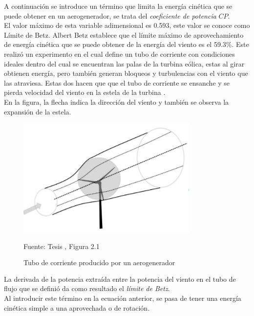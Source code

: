 A continuación se introduce un término que limita la energía cinética que se puede obtener en un aerogenerador, se trata del \textit{coeficiente de potencia} $CP$.\\

El valor máximo de esta variable adimensional es 0.593, este valor se conoce como Límite de Betz. Albert Betz establece que el límite máximo de aprovechamiento de energía cinética que se puede obtener de la energía del viento es el 59.3\%. Este realizó un experimento en el cual define un tubo de corriente con condiciones ideales dentro del cual se encuentran las palas de la turbina eólica, estas al girar obtienen energía, pero también generan bloqueos y turbulencias con el viento que las atraviesa. Estas dos hacen que que el tubo de corriente se ensanche y se pierda velocidad del viento en la estela de la turbina \cite{NEILL201883}.\\


En la figura, la flecha indica la dirección del viento y también se observa la expansión de la estela.

\begin{figure}[H]
    \centering
    \includegraphics[width=0.8\textwidth]{images/Figura articulo Modelling Smart Wind Turbine Blades.PNG}
    \caption{Tubo de corriente producido por un aerogenerador}
    Fuente: Tesis \cite{Vinit2015}, Figura 2.1
    \label{fig:Tubo_corriente_betz}
\end{figure}


La derivada de la potencia extraída entre la potencia del viento en el tubo de flujo que se definió da como resultado el \textit{límite de Betz}.\\


Al introducir este término en la ecuación anterior, se pasa de tener una energía cinética simple a una aprovechada o de rotación.\\




